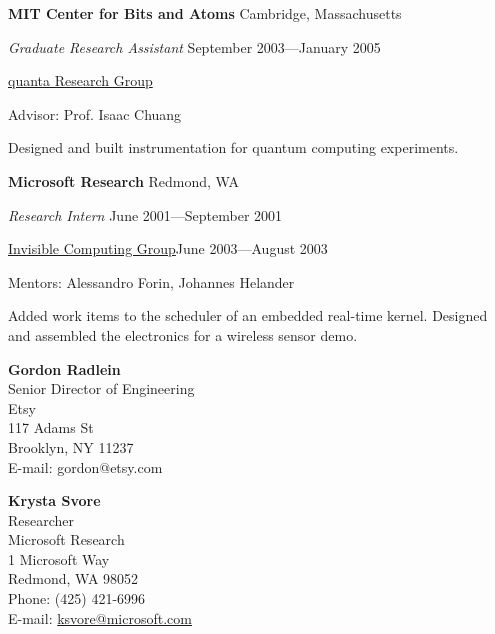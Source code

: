 \documentclass[letter]{article}
\begin{document}
\vspace{\baselineskip}
\par
{\bf MIT Center for Bits and Atoms} \hfill Cambridge, Massachusetts
\par
{\em Graduate Research Assistant} \hfill September 2003---January 2005
\par
\href{http://web.mit.edu/~cua/www/quanta/}{quanta Research Group}
\par
Advisor: Prof. Isaac Chuang
\par
Designed and built instrumentation for quantum computing experiments.
\par

\vspace{\baselineskip}
\par
{\bf Microsoft Research} \hfill Redmond, WA
\par
{\em Research Intern} \hfill June 2001---September 2001
\par
\href{http://research.microsoft.com/en-us/projects/mic/default.aspx}{Invisible Computing Group}\hfill June 2003---August 2003
\par
Mentors: Alessandro Forin, Johannes Helander
\par
Added work items to the scheduler of an embedded real-time kernel.
Designed and assembled the electronics for a wireless sensor demo.

\pagebreak

{\bf Gordon Radlein}
\\
Senior Director of Engineering\\
Etsy\\
117 Adams St\\
Brooklyn, NY 11237\\
E-mail: gordon@etsy.com

\par
\vspace{\baselineskip}
{\bf Krysta Svore}\\
Researcher\\
Microsoft Research\\
1 Microsoft Way\\
Redmond, WA 98052\\
Phone: (425) 421-6996\\
E-mail: \url{ksvore@microsoft.com}\\
\end{document}

